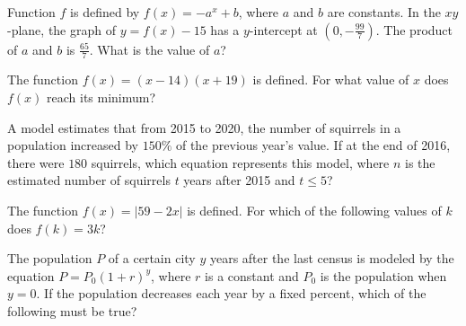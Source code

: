 \noindent\markforreview
\vspace{1em}

Function $f$ is defined by $f(x) = -a^x + b$, where $a$ and $b$ are constants.  
In the $xy$-plane, the graph of $y = f(x) - 15$ has a $y$-intercept at $\left(0, -\frac{99}{7}\right)$.  
The product of $a$ and $b$ is $\frac{65}{7}$. What is the value of $a$?

\newpage

\noindent\markforreview
\vspace{1em}

The function $f(x) = (x - 14)(x + 19)$ is defined.  
For what value of $x$ does $f(x)$ reach its minimum?

\vspace{0.75em}


\vspace{2em}

\noindent\markforreview
\vspace{1em}

A model estimates that from 2015 to 2020, the number of squirrels in a population increased by $150\%$ of the previous year's value.  
If at the end of 2016, there were $180$ squirrels, which equation represents this model, where $n$ is the estimated number of squirrels $t$ years after 2015 and $t \leq 5$?

\vspace{0.75em}


\vspace{2em}
\newpage
\noindent\markforreview
\vspace{1em}

The function $f(x) = |59 - 2x|$ is defined.  
For which of the following values of $k$ does $f(k) = 3k$?

\vspace{0.75em}


\vspace{2em}

\noindent\markforreview
\vspace{1em}

The population $P$ of a certain city $y$ years after the last census is modeled by the equation  
$P = P_0(1 + r)^y$, where $r$ is a constant and $P_0$ is the population when $y = 0$.  
If the population decreases each year by a fixed percent, which of the following must be true?

